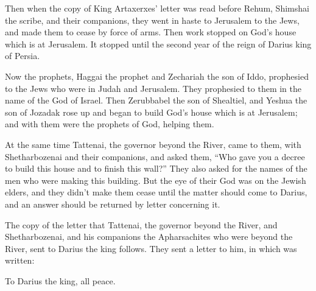 \vspace{\baselineskip} \myverse{}Then when the copy of King Artaxerxes’ letter was read before
Rehum, Shimshai the scribe, and their companions, they went in haste to Jerusalem to the Jews, and made
them to cease by force of arms.
\myverse{}Then work stopped on God’s house which is at Jerusalem. It stopped until the
second year of the reign of Darius king of Persia.


\mychapter{} \myverse*{}Now the prophets, Haggai the prophet and Zechariah the son of Iddo,
prophesied to the Jews who were in Judah and Jerusalem. They prophesied to them in the name of the God
of Israel.
\myverse{}Then Zerubbabel the son of Shealtiel, and Yeshua the son of Jozadak rose up
and began to build God’s house which is at Jerusalem; and with them were the prophets of God, helping
them.

\myverse{}At the same time Tattenai, the governor beyond the River, came
to them, with Shetharbozenai and their companions, and asked them, “Who gave you a decree to build this
house and to finish this wall?”
\myverse{}They also asked for the names of the men who were making this building.
\myverse{}But the eye of their God was on the Jewish elders, and they didn’t make them
cease until the matter should come to Darius, and an answer should be returned by letter concerning it.

\myverse{}The copy of the letter that Tattenai, the governor beyond the River,
and Shetharbozenai, and his companions the Apharsachites who were beyond the River, sent to Darius the
king follows.
\myverse{}They sent a letter to him, in which was written:

\vspace{\baselineskip} 
To Darius the king, all peace.


